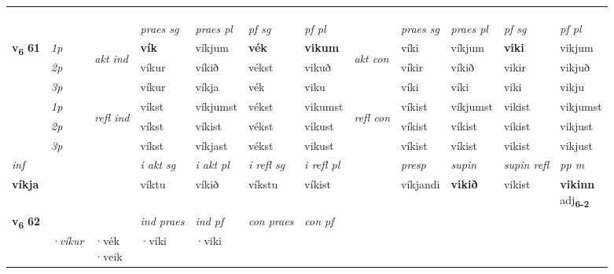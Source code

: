 \begin{longtable}[l]{X>{\footnotesize\itshape}llXXXXlXXXX}
\midrule
 & \\*
   & \\*
  & \\
   \midrule
 & &   & \textit{praes sg}  & \textit{praes pl}    & \textit{ pf sg} & \textit{pf pl} & & \textit{praes sg}  & \textit{praes pl}    & \textit{pf sg} & \textit{pf pl }  \\ \cmidrule{4-7} \cmidrule{9-12}
 \multirow{2}{*}{{{\textbf{v{\textsubscript{6}}} \Large{\textbf{61}}}}}  & 1p & \multirow{3}{*}{\begin{turn}{90}\textit{akt ind}\end{turn}} & \textbf{vík} & víkjum & \textbf{vék} & \textbf{vikum} & \multirow{3}{*}{\begin{turn}{90}\textit{akt con}\end{turn}} &víki & víkjum & \textbf{viki} & vikjum\\*
 & 2p &  &  víkur  & víkið & vékst & vikuð & & víkir & víkið & vikir & vikjuð \\*
 & 3p &  & víkur & víkja & vék & viku & & víki & víki& viki & vikju \\*
\cmidrule{4-7} \cmidrule{9-12}
 & 1p & \multirow{3}{*}{\begin{turn}{90}\textit{refl ind}\end{turn}}  & víkst & víkjumst & vékst & vikumst & \multirow{3}{*}{\begin{turn}{90}\textit{refl con}\end{turn}}  &víkist & víkjumst & vikist & vikjumst \\*
 & 2p &  & víkst & víkist & vékst & vikust & &víkist & víkist & vikist & vikjust \\*
 & 3p  & & víkst & víkjast & vékst & vikust & & víkist & víkist& vikist & vikjust \\*
\cmidrule{4-7} \cmidrule{9-12}

   {\textit{inf}} & &  & \textit{i akt sg} & \textit{i akt pl} & \textit{i refl sg} & \textit{i refl pl} && \textit{presp} & \textit{supin} & \textit{supin refl} & \textit{pp m} \\*
  {\textbf{víkja}} & && víktu  & víkið & víkstu & víkist && víkjandi &  \textbf{vikið} & vikist & \specialcell{\textbf{vikinn} \\ adj\textbf{\textsubscript{6-2}}} \\*

\midrule

\multirow{2}{*}{{{\textbf{v{\textsubscript{6}}} \Large{\textbf{62}}}}}  &&&  \textit{ind praes} & \textit{ind pf} & \textit{con praes} & \textit{con pf} \\*
\multicolumn{3}{r}{\textit{e-m}} & ·víkur & \specialcell{·vék\\  ·veik} & ·víki & ·viki \\*


\end{longtable}
